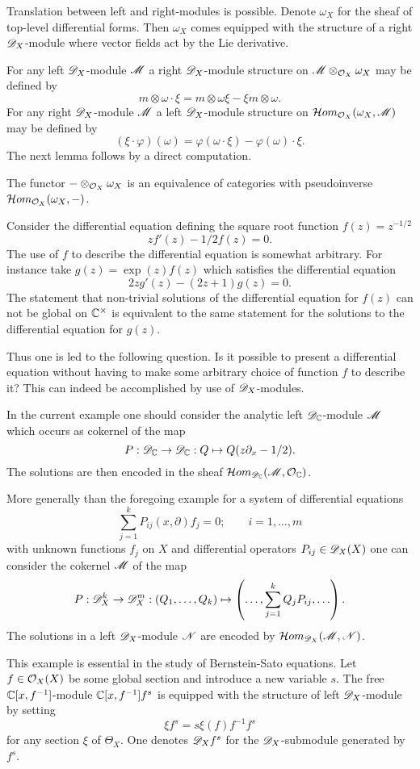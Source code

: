 Translation between left and right-modules is possible.
Denote $\omega_X$ for the sheaf of top-level differential forms.
Then $\omega_X$ comes equipped with the structure of a right $\mathscr{D}_X$-module where vector fields act by the Lie derivative.

For any left $\mathscr{D}_X$-module $\mathscr{M}$ a right $\mathscr{D}_X$-module structure on $\mathscr{M}\otimes_{\mathcal{O}_X}\omega_X$ may be defined by
$$m\otimes \omega \cdot \xi = m\otimes \omega\xi - \xi m \otimes \omega.$$
For any right $\mathscr{D}_X$-module $\mathscr{M}$ a left $\mathscr{D}_X$-module structure on $\mathcal{H}om_{\mathcal{O}_X}(\omega_X, \mathscr{M})$ may be defined by
$$(\xi\cdot \varphi)(\omega) = \varphi(\omega \cdot \xi) - \varphi(\omega)\cdot \xi. $$
The next lemma follows by a direct computation.
\begin{lemma}\label{lem: EquivalencLeftRight}
  The functor ${-}\otimes_{\mathcal{O}_X}\omega_X$ is an equivalence of categories with pseudoinverse  $\mathcal{H}om_{\mathcal{O}_X}(\omega_X,{-})$.
\end{lemma}
\begin{example}\label{ex: Solutions}
  Consider the differential equation defining the square root function $f(z)= z^{-1/2}$
  $$zf'(z) -1/2f(z) = 0.$$
  The use of $f$ to describe the differential equation is somewhat arbitrary.
  For instance take $g(z) = \exp(z)f(z)$ which satisfies the differential equation
  $$2z g'(z) -(2z + 1)g(z) = 0.$$
  The statement that non-trivial solutions of the differential equation for $f(z)$ can not be global on $\mathbb{C}^\times$ is equivalent to the same statement for the solutions to the differential equation for $g(z)$.

  Thus one is led to the following question.
  Is it possible to present a differential equation without having to make some arbitrary choice of function $f$ to describe it?
  This can indeed be accomplished by use of $\mathscr{D}_X$-modules.

  In the current example one should consider the analytic left $\mathscr{D}_{\mathbb{C}}$-module $\mathscr{M}$ which occurs as cokernel of the map
  $$P:\mathscr{D}_{\mathbb{C}} \to \mathscr{D}_{\mathbb{C}}: Q \mapsto  Q(z\partial_x -1/2).$$
  The solutions are then encoded in the sheaf $\mathcal{H}om_{\mathscr{D}_{\mathbb{C}}}(\mathscr{M},\mathcal{O}_{\mathbb{C}})$.
\end{example}
\begin{remark}\label{rem: Solutions}
  More generally than the foregoing example for a system of differential equations
  $$\sum_{j=1}^k P_{ij}(x,\partial) f_j = 0; \qquad i= 1,\ldots,m$$
  with unknown functions $f_j$ on $X$ and differential operators $P_{ij}\in \mathscr{D}_X(X)$
  one can consider the cokernel $\mathscr{M}$ of the map
  $$P:\mathscr{D}_X^k \to \mathscr{D}_X^m : \left(Q_1,\ldots, Q_k\right) \mapsto \left(\ldots, \sum_{j=1}^k Q_j P_{ij},\ldots\right).$$
  The solutions in a left $\mathscr{D}_X$-module $\mathscr{N}$ are encoded by $\mathcal{H}om_{\mathscr{D}_X}(\mathscr{M},\mathscr{N})$.
\end{remark}
\begin{example}\label{ex: fs}
  This example is essential in the study of Bernstein-Sato equations.
  Let $f\in \mathcal{O}_X(X)$ be some global section and introduce a new variable $s$.
  The free $\mathbb{C}[x,f^{-1}]$-module $\mathbb{C}[x,f^{-1}]f^s$ is equipped with the structure of left $\mathscr{D}_X$-module by setting
  $$\xi f^s = s \xi(f)f^{-1}f^{s}$$
  for any section $\xi$ of $\Theta_X$.
  One denotes $\mathscr{D}_Xf^s$ for the $\mathscr{D}_X$-submodule generated by $f^s$.
\end{example}
